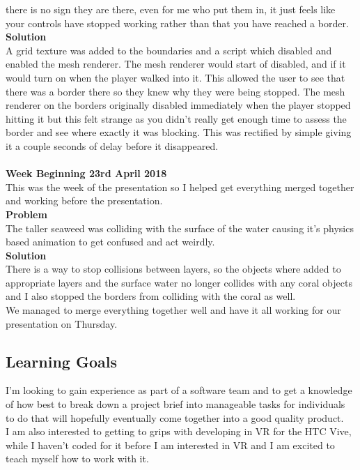 \documentclass[10pt, a4paper]{article}
\begin{document}
	there is no sign they are there, even for me who put them in, it just feels like your controls have
	stopped working rather than that you have reached a border.\\
	\textbf{Solution}\\
	A grid texture was added to the boundaries and a script which disabled and enabled the mesh
	renderer. The mesh renderer would start of disabled, and if it would turn on when the player walked
	into it. This allowed the user to see that there was a border there so they knew why they were being
	stopped. The mesh renderer on the borders originally disabled immediately when the player
	stopped hitting it but this felt strange as you didn't really get enough time to assess the border and
	see where exactly it was blocking. This was rectified by simple giving it a couple seconds of delay
	before it disappeared.\\\\
	
	\textbf{Week Beginning 23rd April 2018}\\
	This was the week of the presentation so I helped get everything merged together and working
	before the presentation.\\
	\textbf{Problem}\\
	The taller seaweed was colliding with the surface of the water causing it's physics based animation
	to get confused and act weirdly.\\
	\textbf{Solution}\\
	There is a way to stop collisions between layers, so the objects where added to appropriate layers
	and the surface water no longer collides with any coral objects and I also stopped the borders from
	colliding with the coral as well.\\
	We managed to merge everything together well and have it all working for our presentation on
	Thursday.
	
	\subsection{Learning Goals}
	I'm looking to gain experience as part of a software team and to get a knowledge of how best to break down a project brief into manageable tasks for individuals to do that will hopefully eventually come together into a good quality product.\\
	
	I am also interested to getting to grips with developing in VR for the HTC Vive, while I haven't coded for it before I am interested in VR and I am excited to teach myself how to work with it.\\
	
\end{document}

